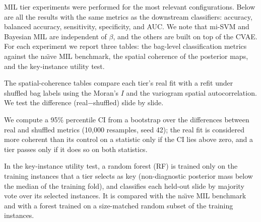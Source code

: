 MIL tier experiments were performed for the most relevant configurations. Below are all the results with the same metrics as the downstream classifiers: accuracy, balanced accuracy, sensitivity, specificity, and AUC. We note that mi-SVM and Bayesian MIL are independent of $\beta$, and the others are built on top of the CVAE. For each experiment we report three tables: the bag-level classification metrics against the na\"{\i}ve MIL benchmark, the spatial coherence of the posterior maps, and the key-instance utility test.

The spatial-coherence tables compare each tier's real fit with a refit under shuffled bag labels using the Moran's $I$ and the variogram spatial autocorrelation. We test the difference (real$-$shuffled) slide by slide. 

We compute a 95\% percentile CI from a bootstrap over the differences between real and shuffled metrics (10,000 resamples, seed 42); the real fit is considered more coherent than its control on a statistic only if the CI lies above zero, and a tier passes only if it does so on both statistics. 

In the key-instance utility test, a random forest (RF) is trained only on the training instances that a tier selects as key (non-diagnostic posterior mass below the median of the training fold), and classifies each held-out slide by majority vote over its selected instances. It is compared with the na\"{\i}ve MIL benchmark and with a forest trained on a size-matched random subset of the training instances.

